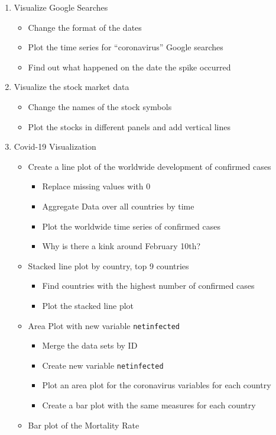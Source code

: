 \documentclass[
  11pt,
]{article}
\providecommand{\tightlist}{%
  \setlength{\itemsep}{0pt}\setlength{\parskip}{0pt}}
\begin{document}
\begin{enumerate}
\def\labelenumi{\arabic{enumi}.}
\tightlist
\item
  Visualize Google Searches

  \begin{itemize}
  \tightlist
  \item
    Change the format of the dates
  \item
    Plot the time series for ``coronavirus'' Google searches
  \item
    Find out what happened on the date the spike occurred
  \end{itemize}
\item
  Visualize the stock market data

  \begin{itemize}
  \tightlist
  \item
    Change the names of the stock symbols
  \item
    Plot the stocks in different panels and add vertical lines
  \end{itemize}
\item
  Covid-19 Visualization

  \begin{itemize}
  \tightlist
  \item
    Create a line plot of the worldwide development of confirmed cases

    \begin{itemize}
    \tightlist
    \item
      Replace missing values with 0
    \item
      Aggregate Data over all countries by time
    \item
      Plot the worldwide time series of confirmed cases
    \item
      Why is there a kink around February 10th?
    \end{itemize}
  \item
    Stacked line plot by country, top 9 countries

    \begin{itemize}
    \tightlist
    \item
      Find countries with the highest number of confirmed cases
    \item
      Plot the stacked line plot
    \end{itemize}
  \item
    Area Plot with new variable \texttt{netinfected}

    \begin{itemize}
    \tightlist
    \item
      Merge the data sets by ID
    \item
      Create new variable \texttt{netinfected}
    \item
      Plot an area plot for the coronavirus variables for each country
    \item
      Create a bar plot with the same measures for each country
    \end{itemize}
  \item
    Bar plot of the Mortality Rate


\end{itemize}
\end{enumerate}
\end{document}
